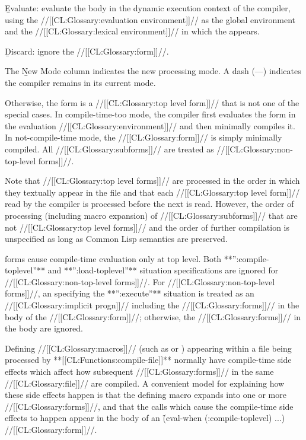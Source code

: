  \item{}\b{Evaluate:} evaluate the body in the dynamic execution context of the compiler, using the //[[CL:Glossary:evaluation environment]]// as the global environment and the //[[CL:Glossary:lexical environment]]// in which the  appears.
  \item{}\b{Discard:} ignore the //[[CL:Glossary:form]]//. \endlist

The \b{New Mode} column indicates the new processing mode.  A dash (---) indicates the compiler remains in its current mode.

  Otherwise, the form is a //[[CL:Glossary:top level form]]// that is not one of the special cases.  In compile-time-too mode, the compiler first evaluates the form in the evaluation  //[[CL:Glossary:environment]]// and then minimally compiles it.  In not-compile-time mode, the //[[CL:Glossary:form]]// is simply minimally compiled.  All //[[CL:Glossary:subforms]]// are treated as //[[CL:Glossary:non-top-level forms]]//.

Note that //[[CL:Glossary:top level forms]]// are processed in the order in which they textually appear in the file and that each  //[[CL:Glossary:top level form]]// read by the compiler is processed before the next is read.  However, the order of processing (including macro expansion) of //[[CL:Glossary:subforms]]// that are not //[[CL:Glossary:top level forms]]// and the order of further compilation is unspecified as long as Common Lisp semantics are preserved.

\endlist 
   forms cause compile-time evaluation only at top level.  Both **'':compile-toplevel''** and **'':load-toplevel''** situation specifications are ignored for //[[CL:Glossary:non-top-level forms]]//. For //[[CL:Glossary:non-top-level forms]]//,  an  specifying the **'':execute''** situation is treated as an //[[CL:Glossary:implicit progn]]// including the //[[CL:Glossary:forms]]// in the body of the  //[[CL:Glossary:form]]//; otherwise, the //[[CL:Glossary:forms]]// in the body are ignored.

 


Defining //[[CL:Glossary:macros]]// (such as  or ) appearing within a file being processed by **[[CL:Functions:compile-file]]** normally have compile-time side effects which affect how subsequent //[[CL:Glossary:forms]]// in the same //[[CL:Glossary:file]]// are compiled.  A convenient model for explaining how these side effects happen is that the defining macro expands into one or more  //[[CL:Glossary:forms]]//, and that the calls which cause the compile-time side effects to happen appear  in the body of an \f{(eval-when (:compile-toplevel) ...)} //[[CL:Glossary:form]]//.

